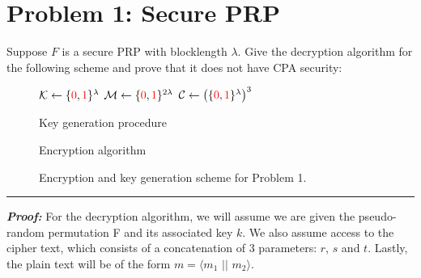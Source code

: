 \section{Problem 1: Secure PRP}\label{sec:problem1}

Suppose $F$ is a secure PRP with blocklength $\lambda$.
Give the decryption algorithm for the following scheme and prove that it does not have CPA security:

\begin{figure}[h!]
    \centering
\begin{minipage}[t]{.45\textwidth}
\null 
 \begin{algorithm}[H]
    \DontPrintSemicolon
    $\mathcal{K} \gets \{\textcolor{red}{0}, \textcolor{red}{1}\}^{\lambda}$ \;
    $\mathcal{M} \gets \{ \textcolor{red}{0} , \textcolor{red}{1} \}^{2\lambda}$ \;
    $\mathcal{C} \gets \left( \{ \textcolor{red}{0} , \textcolor{red}{1} \}^{\lambda}\right)^3$ \;
    \caption{Key generation procedure}
  \end{algorithm}
\end{minipage}%
\begin{minipage}[t]{.45\textwidth}
\null
 \begin{algorithm}[H]
    \DontPrintSemicolon
     \vspace{4.4pt}
    \caption{Encryption algorithm}
  \end{algorithm}
\end{minipage}
    \caption{Encryption and key generation scheme for Problem 1.\label{prob1:encryption}}
\end{figure}
\begin{center}
    \rule{5cm}{0.4pt}
\end{center}

\textbf{\textit{Proof:}}
For the decryption algorithm, we will assume we are given the pseudo-random permutation F and its associated key $k$.
We also assume access to the cipher text, which consists of a concatenation of 3 parameters: $r$, $s$ and $t$.
Lastly, the plain text will be of the form $m = \langle m_1$ $\vert \vert$ $m_2 \rangle$.

